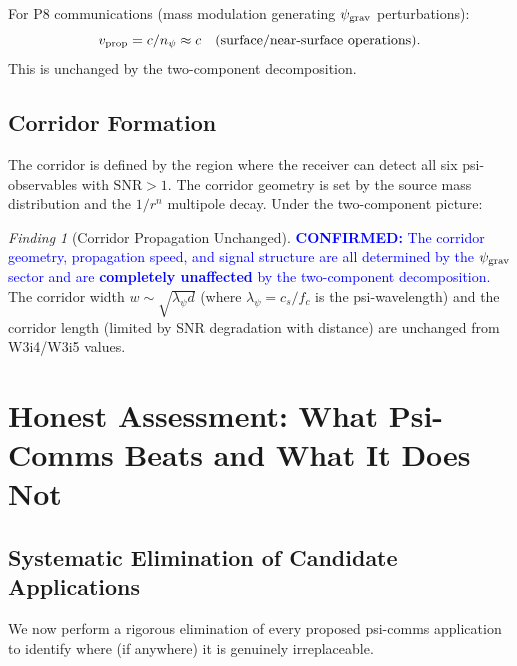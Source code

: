 \documentclass[11pt]{article}
\theoremstyle{definition}
\theoremstyle{remark}
\newtheorem{finding}[theorem]{Finding}
\newcommand{\psigrav}{\psi_{\rm grav}}
\newcommand{\SNR}{\mathrm{SNR}}
\newcommand{\confirmed}[1]{\textcolor{blue}{\textbf{CONFIRMED:} #1}}
\begin{document}
For P8 communications (mass modulation generating $\psigrav$ perturbations):
\begin{equation}
v_{\rm prop} = c/n_\psi \approx c \quad\text{(surface/near-surface operations)}.
\end{equation}
This is unchanged by the two-component decomposition.

\subsection{Corridor Formation}

The corridor is defined by the region where the receiver can detect
all six psi-observables with $\SNR > 1$. The corridor geometry is set by
the source mass distribution and the $1/r^n$ multipole decay. Under the
two-component picture:

\begin{finding}[Corridor Propagation Unchanged]
\label{find:corridor_unchanged}
\confirmed{The corridor geometry, propagation speed, and signal
structure are all determined by the $\psigrav$ sector and are
\textbf{completely unaffected} by the two-component decomposition.}
The corridor width $w \sim \sqrt{\lambda_\psi d}$ (where
$\lambda_\psi = c_s/f_c$ is the psi-wavelength) and the corridor
length (limited by SNR degradation with distance) are unchanged from
W3i4/W3i5 values.
\end{finding}

\section{Honest Assessment: What Psi-Comms Beats and What It Does Not}
\label{sec:honest_assessment}

\subsection{Systematic Elimination of Candidate Applications}

We now perform a rigorous elimination of every proposed psi-comms
application to identify where (if anywhere) it is genuinely
irreplaceable.
\end{document}
